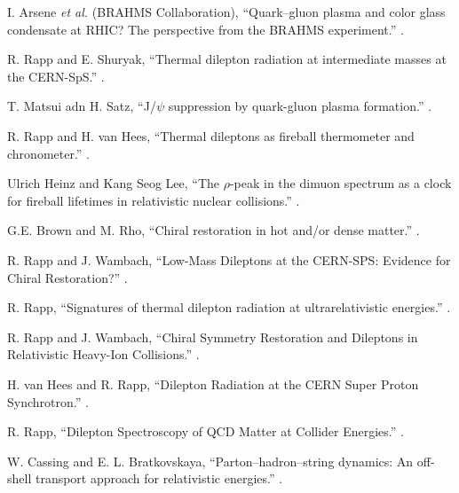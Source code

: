 \begin{thebibliography}{10}
I. Arsene {\it et al.} (BRAHMS Collaboration),
\newblock ``Quark–gluon plasma and color glass condensate at RHIC? The perspective from the BRAHMS experiment.''
.

R. Rapp and E. Shuryak,
\newblock ``Thermal dilepton radiation at intermediate masses at the CERN-SpS.''
.

T. Matsui adn H. Satz,
\newblock ``J/$\psi$ suppression by quark-gluon plasma formation.''
.

R. Rapp and H. van Hees,
\newblock ``Thermal dileptons as fireball thermometer and chronometer.''
.

Ulrich Heinz and Kang Seog Lee,
\newblock ``The $\rho$-peak in the dimuon spectrum as a clock for fireball lifetimes in relativistic nuclear collisions.''
.

G.E. Brown and M. Rho,
\newblock ``Chiral restoration in hot and/or dense matter.''
.

R. Rapp and J. Wambach,
\newblock ``Low-Mass Dileptons at the CERN-SPS: Evidence for Chiral Restoration?''
.

R. Rapp,
\newblock ``Signatures of thermal dilepton radiation at ultrarelativistic energies.''
.

R. Rapp and J. Wambach,
\newblock ``Chiral Symmetry Restoration and Dileptons in Relativistic Heavy-Ion Collisions.''
.

H. van Hees and R. Rapp,
\newblock ``Dilepton Radiation at the CERN Super Proton Synchrotron.''
.

R. Rapp,
\newblock ``Dilepton Spectroscopy of QCD Matter at Collider Energies.''
.

W. Cassing and E. L. Bratkovskaya,
\newblock ``Parton–hadron–string dynamics: An off-shell transport approach for relativistic energies.''
.


\end{thebibliography}
